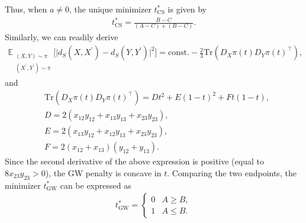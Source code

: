 \documentclass{article}
\begin{document}
Thus, when $a \neq 0$, the unique minimizer $t_{\mathrm{CS}}^\ast$ is given by 
\begin{align*}
	t_{\mathrm{CS}}^\ast = \frac{B - C}{(A - C) + (B - C)} .
\end{align*}
Similarly, we can readily derive
\begin{align*}
	\mathbb{E}_{\substack{(X,Y)\sim\pi\\(X^\prime,Y^\prime)\sim\pi}}
	\Big[\big|d_S(X,X^\prime)-d_S(Y,Y^\prime)\big|^2\Big] = \mathrm{const.} - \frac{2}{3}\mathrm{Tr}(D_X \pi(t) D_Y \pi(t)^\top) ,
\end{align*}
and
\begin{align*}
	&\mathrm{Tr}(D_X \pi(t) D_Y \pi(t)^\top) = D t^2 + E (1 - t)^2 + Ft(1-t) , \\[5pt]
	&D = 2(x_{12}y_{12} + x_{13}y_{13} + x_{23}y_{23}) , \\
	&E = 2(x_{13}y_{12} + x_{12}y_{13} + x_{23}y_{23}) , \\
	&F = 2(x_{12}+x_{13})(y_{12} + y_{13}) .
\end{align*}
Since the second derivative of the above expression is positive (equal to $8x_{23}y_{23} > 0$),  
the GW penalty is concave in $t$.  
Comparing the two endpoints, the minimizer $t_{\mathrm{GW}}^\ast$ can be expressed as
\begin{align*}
	t_{\mathrm{GW}}^\ast = \begin{cases}
		0 & A \geq B , \\
		1 & A \leq B .
	\end{cases}
\end{align*}
\end{document}
